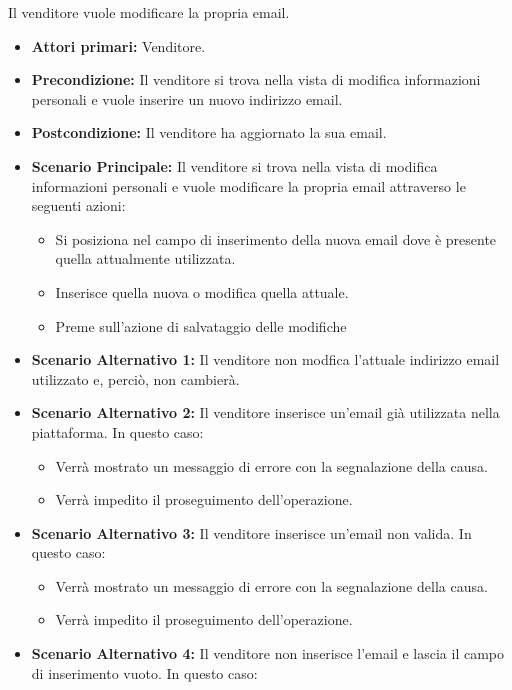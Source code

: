 Il venditore vuole modificare la propria email.
\begin{itemize}
    \item \textbf{Attori primari:} Venditore.
    \item \textbf{Precondizione:} Il venditore si trova nella vista di modifica informazioni personali e vuole inserire un nuovo indirizzo email.
    \item \textbf{Postcondizione:} Il venditore ha aggiornato la sua email.
    \item \textbf{Scenario Principale:} Il venditore si trova nella vista di modifica informazioni personali e vuole modificare la propria email attraverso le seguenti azioni:
    \begin{itemize}
        \item Si posiziona nel campo di inserimento della nuova email dove è presente quella attualmente utilizzata.
        \item Inserisce quella nuova o modifica quella attuale.
        \item Preme sull'azione di salvataggio delle modifiche
    \end{itemize}
    \item \textbf{Scenario Alternativo 1:} Il venditore non modfica l'attuale indirizzo email utilizzato e, perciò, non cambierà.
    \item \textbf{Scenario Alternativo 2:} Il venditore inserisce un'email già utilizzata nella piattaforma. In questo caso:
    \begin{itemize}
        \item Verrà mostrato un messaggio di errore con la segnalazione della causa.
        \item Verrà impedito il proseguimento dell'operazione.
    \end{itemize}
    \item \textbf{Scenario Alternativo 3:} Il venditore inserisce un'email non valida. In questo caso:
    \begin{itemize}
        \item Verrà mostrato un messaggio di errore con la segnalazione della causa.
        \item Verrà impedito il proseguimento dell'operazione.
    \end{itemize}
    \item \textbf{Scenario Alternativo 4:} Il venditore non inserisce l'email e lascia il campo di inserimento vuoto. In questo caso:
    \begin{itemize}

\end{itemize}
\end{itemize}
